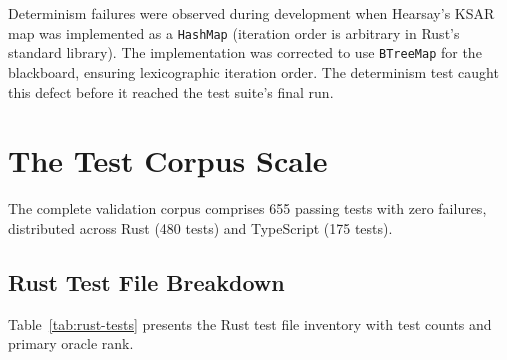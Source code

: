 Determinism failures were observed during development when Hearsay's KSAR map was implemented
as a \texttt{HashMap} (iteration order is arbitrary in Rust's standard library). The
implementation was corrected to use \texttt{BTreeMap} for the blackboard, ensuring
lexicographic iteration order. The determinism test caught this defect before it reached the
test suite's final run.

\section{The Test Corpus Scale}
\label{sec:test-corpus}

The complete validation corpus comprises 655 passing tests with zero failures, distributed
across Rust (480 tests) and TypeScript (175 tests).

\subsection{Rust Test File Breakdown}

Table~\ref{tab:rust-tests} presents the Rust test file inventory with test counts and
primary oracle rank.

